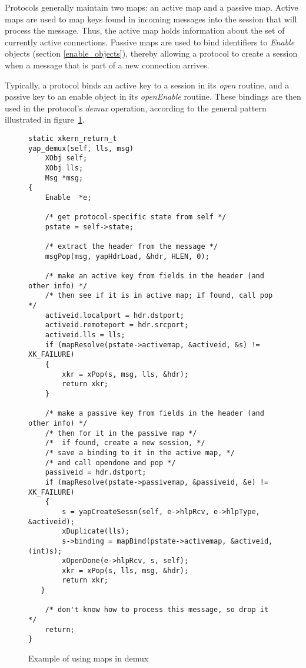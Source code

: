 Protocols generally maintain two maps: an active map and a passive
map.  Active maps are used to map keys found in incoming messages into
the session that will process the message. Thus, the active map holds
information about the set of currently active connections. Passive
maps are used to bind identifiers to {\em Enable} objects 
(section \ref{enable_objects}),
thereby allowing a
protocol to create a session when a message that is part of a new
connection arrives.

Typically, a protocol binds an active key to a session in its {\em
open} routine, and a passive key to an enable object in its {\em
openEnable} routine. These bindings are then used in the protocol's
{\em demux} operation, according to the general pattern illustrated in
figure~\ref{fig:mapfig}.

\begin{figure}
\caption{Example of using maps in demux \label{fig:mapfig}}
\begin{verbatim}
static xkern_return_t
yap_demux(self, lls, msg)
    XObj self;
    XObj lls;
    Msg *msg;
{
    Enable  *e;
    
    /* get protocol-specific state from self */
    pstate = self->state;

    /* extract the header from the message */
    msgPop(msg, yapHdrLoad, &hdr, HLEN, 0);

    /* make an active key from fields in the header (and other info) */
    /* then see if it is in active map; if found, call pop */
    activeid.localport = hdr.dstport;
    activeid.remoteport = hdr.srcport;
    activeid.lls = lls;
    if (mapResolve(pstate->activemap, &activeid, &s) != XK_FAILURE)
    {  
        xkr = xPop(s, msg, lls, &hdr);
        return xkr;
    }

    /* make a passive key from fields in the header (and other info) */
    /* then for it in the passive map */
    /*  if found, create a new session, */
    /* save a binding to it in the active map, */
    /* and call opendone and pop */
    passiveid = hdr.dstport;
    if (mapResolve(pstate->passivemap, &passiveid, &e) != XK_FAILURE) 
    {
        s = yapCreateSessn(self, e->hlpRcv, e->hlpType, &activeid);
        xDuplicate(lls);
        s->binding = mapBind(pstate->activemap, &activeid, (int)s);
        xOpenDone(e->hlpRcv, s, self);
        xkr = xPop(s, lls, msg, &hdr);
        return xkr;
   }

    /* don't know how to process this message, so drop it */
    return;
}
\end{verbatim}
\end{figure}

